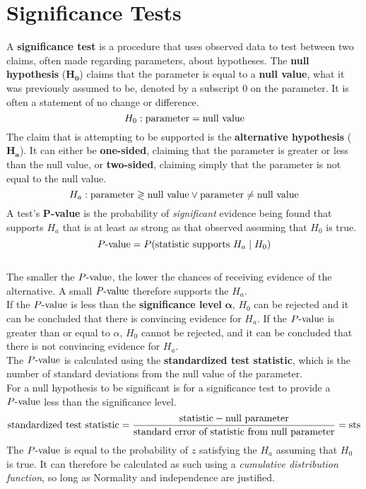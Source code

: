 \documentclass[../AP_Statistics.tex]{subfiles}
\begin{document}
	\chapter{Significance Tests}
		A \textbf{significance test} is a procedure that uses observed data to test between two claims, often made regarding parameters, about hypotheses.
		The \textbf{null hypothesis} ($\bm{H_0}$) claims that the parameter is equal to a \textbf{null value}, what it was previously assumed to be, denoted by a subscript $0$ on the parameter. It is often a statement of no change or difference.
		\[H_0:\rm{parameter} = \text{null value}\]
		The claim that is attempting to be supported is the \textbf{alternative hypothesis} ($\bm{H_a}$). It can either be \textbf{one-sided}, claiming that the parameter is greater or less than the null value, or \textbf{two-sided}, claiming simply that the parameter is not equal to the null value.
		\[H_a:\rm{parameter} \gtrless \text{null value} \lor \rm{parameter} \ne \text{null value}\]
		A test's $\bm{P}$\textbf{-value} is the probability of \emph{significant} evidence being found that supports $H_a$ that is at least as strong as that observed assuming that $H_0$ is true.
		\[P\text{-value} = P(\text{statistic supports } H_a \mid H_0)\] \\
		The smaller the $P\text{-value}$, the lower the chances of receiving evidence of the alternative. A small $P\text{-value}$ therefore supports the $H_a$. \\
		If the $P\text{-value}$ is less than the \textbf{significance level} $\bm{\alpha}$, $H_0$ can be rejected and it can be concluded that there is convincing evidence for $H_a$. If the $P\text{-value}$ is greater than or equal to $\alpha$, $H_0$ cannot be rejected, and it can be concluded that there is not convincing evidence for $H_a$. \\
		The $P\text{-value}$ is calculated using the \textbf{standardized test statistic}, which is the number of standard deviations from the null value of the parameter. \\
		For a null hypothesis to be significant is for a significance test to provide a $P\text{-value}$ less than the significance level.
		\[\text{standardized test statistic} = \frac{\text{statistic} - \text{null parameter}}{\text{standard error of statistic from null parameter}} = \mathrm{sts}\]
		The $P\text{-value}$ is equal to the probability of $z$ satisfying the $H_a$ assuming that $H_0$ is true. It can therefore be calculated as such using a \emph{cumulative distribution function}, so long as Normality and independence are justified.
\end{document}
